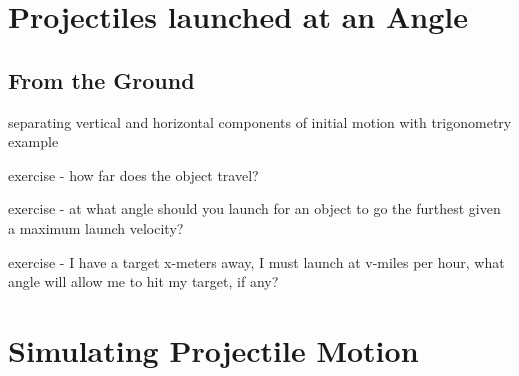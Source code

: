 \section{Projectiles launched at an Angle}
\subsection{From the Ground}
separating vertical and horizontal components of initial motion with trigonometry
example

exercise - how far does the object travel?

exercise - at what angle should you launch for an object to go the furthest given a maximum launch velocity?

exercise - I have a target x-meters away, I must launch at v-miles per hour, what angle will allow me to hit my target, if any?

\section{Simulating Projectile Motion}
